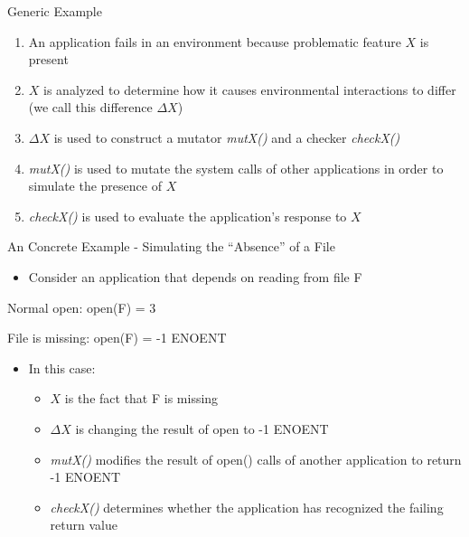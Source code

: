 \documentclass[pdf]{beamer}
\begin{document}
\begin{frame}{Generic Example}
  \begin{enumerate}
    \item{An application fails in an environment because problematic
      feature $X$ is present}
    \item{$X$ is analyzed to determine how it causes environmental
      interactions to differ (we call this difference $\Delta X$)}
    \item{$\Delta X$ is used to construct a mutator \textit{mutX()} and
      a checker \textit{checkX()}}
    \item{\textit{mutX()} is used to mutate the system calls of other
      applications in order to simulate the presence of $X$}
    \item{\textit{checkX()} is used to evaluate the application's response
      to $X$}
  \end{enumerate}
\end{frame}


\begin{frame}{An Concrete Example - Simulating the ``Absence'' of a File}
  \begin{itemize}
    \item{Consider an application that depends on reading from file F}
  \end{itemize}

  Normal open: open(F) = 3

  File is missing: open(F) = -1 ENOENT

  \begin{itemize}
    \item{In this case:}
      \begin{itemize}
        \item{$X$ is the fact that F is missing}
        \item{$\Delta X$ is changing the result of open to -1 ENOENT}
        \item{\textit{mutX()} modifies the result of open() calls of another
          application to return -1 ENOENT}
        \item{\textit{checkX()} determines whether the application has
          recognized the failing return value}
      \end{itemize}
  \end{itemize}
\end{frame}
\end{document}
